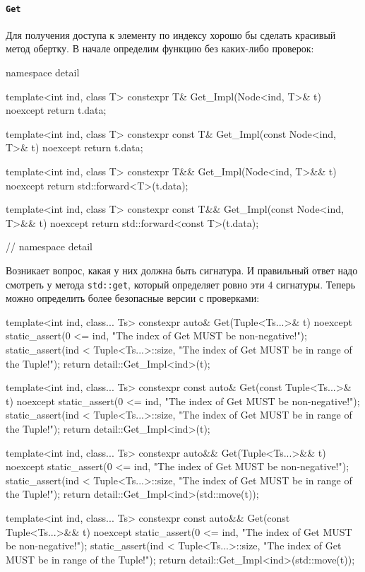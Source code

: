\paragraph{\texttt{Get}}

Для получения доступа к элементу по индексу хорошо бы сделать красивый метод обертку.
В начале определим функцию без каких-либо проверок:
\begin{cppcode}
namespace detail {
template<int ind, class T>
constexpr T& Get_Impl(Node<ind, T>& t) noexcept {
  return t.data;
}

template<int ind, class T>
constexpr const T& Get_Impl(const Node<ind, T>& t) noexcept {
  return t.data;
}

template<int ind, class T>
constexpr T&& Get_Impl(Node<ind, T>&& t) noexcept {
  return std::forward<T>(t.data);
}

template<int ind, class T>
constexpr const T&& Get_Impl(const Node<ind, T>&& t) noexcept {
  return std::forward<const T>(t.data);
}
} // namespace detail
\end{cppcode}
Возникает вопрос, какая у них должна быть сигнатура.
И правильный ответ надо смотреть у метода \verb"std::get", который определяет ровно эти $4$ сигнатуры.
Теперь можно определить более безопасные версии с проверками:
\begin{cppcode}
template<int ind, class... Ts>
constexpr auto& Get(Tuple<Ts...>& t) noexcept {
  static_assert(0 <= ind, "The index of Get MUST be non-negative!");
  static_assert(ind < Tuple<Ts...>::size, "The index of Get MUST be in range of the Tuple!");
  return detail::Get_Impl<ind>(t);
}

template<int ind, class... Ts>
constexpr const auto& Get(const Tuple<Ts...>& t) noexcept {
  static_assert(0 <= ind, "The index of Get MUST be non-negative!");
  static_assert(ind < Tuple<Ts...>::size, "The index of Get MUST be in range of the Tuple!");
  return detail::Get_Impl<ind>(t);
}

template<int ind, class... Ts>
constexpr auto&& Get(Tuple<Ts...>&& t) noexcept {
  static_assert(0 <= ind, "The index of Get MUST be non-negative!");
  static_assert(ind < Tuple<Ts...>::size, "The index of Get MUST be in range of the Tuple!");
  return detail::Get_Impl<ind>(std::move(t));
}

template<int ind, class... Ts>
constexpr const auto&& Get(const Tuple<Ts...>&& t) noexcept {
  static_assert(0 <= ind, "The index of Get MUST be non-negative!");
  static_assert(ind < Tuple<Ts...>::size, "The index of Get MUST be in range of the Tuple!");
  return detail::Get_Impl<ind>(std::move(t));
}
\end{cppcode}
